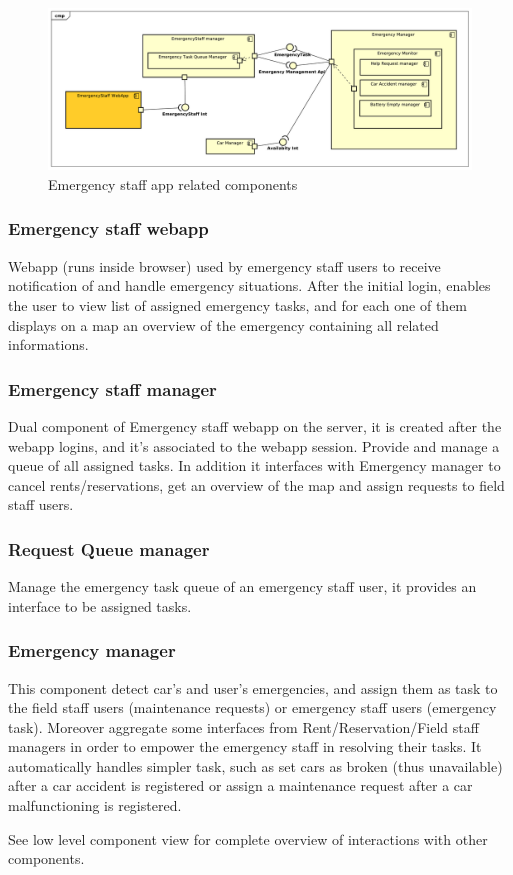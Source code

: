 \documentclass[english]{article}
\begin{document}
	\begin{figure}[H]
		\centering
		\includegraphics[scale=0.35]{./ComponentDiagrams/EmergencyStaff.pdf}%
		\caption{Emergency staff app related components}
	\end{figure}

	\subsubsection{Emergency staff webapp}
	Webapp (runs inside browser) used by emergency staff users to receive notification of and handle emergency situations. After the initial login, enables the user to view list of assigned emergency tasks, and for each one of them displays on a map an overview of the emergency containing all related informations.
	\subsubsection{Emergency staff manager}
	Dual component of Emergency staff webapp on the server, it is created after the webapp logins, and it's associated to the webapp session. Provide and manage a queue of all assigned tasks. In addition it interfaces with Emergency manager to cancel rents/reservations, get an overview of the map and assign requests to field staff users.
		\subsubsection{Request Queue manager}
		Manage the emergency task queue of an emergency staff user, it provides an interface to be assigned tasks.
	\subsubsection{Emergency manager}
	This component detect car's and user's emergencies, and assign them as task to the field staff users (maintenance requests) or  emergency staff users (emergency task). Moreover aggregate some interfaces from Rent/Reservation/Field staff managers in order to empower the emergency staff in resolving their tasks. It automatically handles simpler task, such as set cars as broken (thus unavailable) after a car accident is registered or assign a maintenance request after a car malfunctioning is registered. \par See low level component view for complete overview of interactions with other components.
\end{document}

